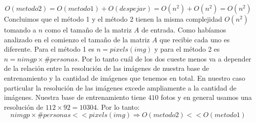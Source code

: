 \begin{displaymath}
 O(metodo2) = O(metodo1) + O(despejar) = O(n^2) + O(n^2) = O(n^2)
\end{displaymath}
Concluimos que el método 1 y el método 2 tienen la misma complejidad $O(n^2)$ tomando a $n$ como el tamaño de la matriz $A$ de entrada.
Como habíamos analizado en el comienzo el tamaño de la matriz $A$ que recibie cada uno es diferente. Para el método 1 es $n = pixels(img)$ y
para el método 2 es $n = nimgp \times \#personas$. Por lo tanto cuál de los dos cueste menos va a depender de la relación entre la resolución
de las imágenes de nuestra base de entrenamiento y la cantidad de imágenes que tenemos en total. En nuestro caso particular la resolución de las
imágenes excede ampliamente a la cantidad de imágenes. Nuestra base de entrenamiento tiene $410$ fotos y en general usamos una resolución
de $112 \times 92 = 10304$. Por lo tanto: 
\begin{displaymath}
 nimgp \times \#personas << pixels(img) \Rightarrow O(metodo2) << O(metodo1)
\end{displaymath}





